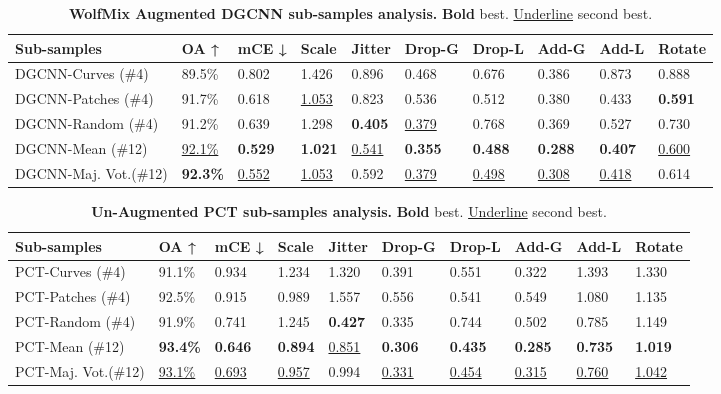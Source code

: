 \documentclass[10pt,twocolumn]{article}
\begin{document}
\begin{table*}
  \centering
    \begin{tabular}{p{4cm} || p{1.1cm} p{1.1cm} p{1.1cm} p{1.1cm} p{1.2cm} p{1.2cm} p{1.1cm} p{1.1cm} p{1.1cm}}
    \hline
    Sub-samples & OA ↑ & mCE ↓ & Scale & Jitter & Drop-G & Drop-L & Add-G & Add-L & Rotate \\
    \hline
    DGCNN-Curves (\#4) & 89.5\% & 0.802 & 1.426 & 0.896 & 0.468 & 0.676 & 0.386 & 0.873 & 0.888\\
    DGCNN-Patches (\#4) & 91.7\% & 0.618 & \underline{1.053} & 0.823 & 0.536 & 0.512 & 0.380 & 0.433 & \textbf{0.591}\\
    DGCNN-Random (\#4) & 91.2\% & 0.639 & 1.298 & \textbf{0.405} & \underline{0.379} & 0.768 & 0.369 & 0.527 & 0.730\\
    \hline
    DGCNN-Mean (\#12) & \underline{92.1\%} & \textbf{0.529} & \textbf{1.021} &  \underline{0.541} & \textbf{0.355} &  \textbf{0.488} & \textbf{0.288} & \textbf{0.407} &  \underline{0.600}\\
    DGCNN-Maj. Vot.(\#12) & \textbf{92.3\%} & \underline{0.552} & \underline{1.053} &  0.592 & \underline{0.379} &  \underline{0.498} & \underline{0.308} & \underline{0.418} &  0.614\\
    
    \hline
  \end{tabular}
  \caption{{\bf WolfMix Augmented DGCNN sub-samples analysis.} {\bf Bold} best. \underline{Underline} second best.}
  \label{table:dgcnn_augmented_sub_samples}
\end{table*}

\begin{table*}
  \centering
    \begin{tabular}{p{4cm} || p{1.1cm} p{1.1cm} p{1.1cm} p{1.1cm} p{1.2cm} p{1.2cm} p{1.1cm} p{1.1cm} p{1.1cm}}
    \hline
    Sub-samples & OA ↑ & mCE ↓ & Scale & Jitter & Drop-G & Drop-L & Add-G & Add-L & Rotate \\
    \hline
    PCT-Curves (\#4) & 91.1\% & 0.934 & 1.234 & 1.320 & 0.391 & 0.551 & 0.322 & 1.393 & 1.330\\
    PCT-Patches (\#4) & 92.5\% & 0.915 & 0.989 & 1.557 & 0.556 & 0.541 & 0.549 & 1.080 & 1.135\\
    PCT-Random (\#4) & 91.9\% & 0.741 & 1.245 & \textbf{0.427} & 0.335 & 0.744 & 0.502 & 0.785 & 1.149\\
    \hline
    PCT-Mean (\#12) & \textbf{93.4\%} & \textbf{0.646} & \textbf{0.894} & \underline{0.851} & \textbf{0.306} &  \textbf{0.435} & \textbf{0.285} & \textbf{0.735} &  \textbf{1.019}\\
    PCT-Maj. Vot.(\#12) & \underline{93.1\%} & \underline{0.693} & \underline{0.957} & 0.994 & \underline{0.331} &  \underline{0.454} & \underline{0.315} & \underline{0.760} &  \underline{1.042}\\
    
    \hline
  \end{tabular}
  \caption{{\bf Un-Augmented PCT sub-samples analysis.} {\bf Bold} best. \underline{Underline} second best.}
  \label{table:pct_unaugmented_sub_samples}
\end{table*}
\end{document}
